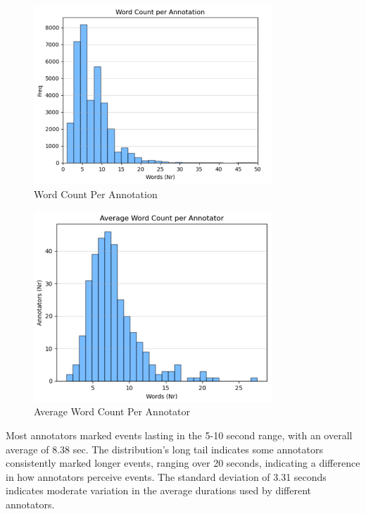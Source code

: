 \documentclass{article}
\begin{document}
\begin{figure}[ht]
  \centering
  \includegraphics[width=0.8\textwidth]{figures/annotation_quality/word_count_per_annotation.png}
  \caption{Word Count Per Annotation}
  \label{fig:word_count}
\end{figure}

\begin{figure}[ht]
  \centering
  \includegraphics[width=0.8\textwidth]{figures/annotation_quality/average_word_count_per_annotator.png}
  \caption{Average Word Count Per Annotator}
  \label{fig:avg_word_count}
\end{figure}

Most annotators marked events lasting in the 5-10 second range, with an overall average of 8.38 sec. The distribution's long tail indicates some annotators consistently marked longer events, ranging over 20 seconds, indicating a difference in how annotators perceive events. The standard deviation of 3.31 seconds indicates moderate variation in the average durations used by different annotators.
\end{document}
